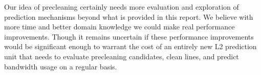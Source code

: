 Our idea of precleaning certainly needs more evaluation and exploration of prediction mechanisms beyond what is provided in this report. We believe with more time and better domain knowledge we could make real performance improvements. Though it remains uncertain if these performance improvements would be significant enough to warrant the cost of an entirely new L2 prediction unit that needs to evaluate precleaning candidates, clean lines, and predict bandwidth usage on a regular basis.
